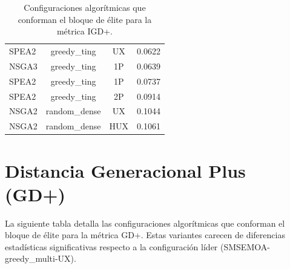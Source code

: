 \begin{table}[H]
\begin{tabular}{lccc}
        SPEA2 & greedy\_ting & UX & 0.0622 \\
        NSGA3 & greedy\_ting & 1P & 0.0639 \\
        SPEA2 & greedy\_ting & 1P & 0.0737 \\
        SPEA2 & greedy\_ting & 2P & 0.0914 \\
        NSGA2 & random\_dense & UX & 0.1044 \\
        NSGA2 & random\_dense & HUX & 0.1061 \\
        \bottomrule
    \end{tabular}
    \caption[Bloque de élite de IGD+]{Configuraciones algorítmicas que conforman el bloque de élite para la métrica IGD+.}
    \label{tab:elite_igd}
\end{table}

\section{Distancia Generacional Plus (GD+)}\label{anexo:elite_gd}

La siguiente tabla detalla las configuraciones algorítmicas que conforman el bloque de élite para la métrica GD+. Estas variantes carecen de diferencias estadísticas significativas respecto a la configuración líder (SMSEMOA-greedy\_multi-UX).

